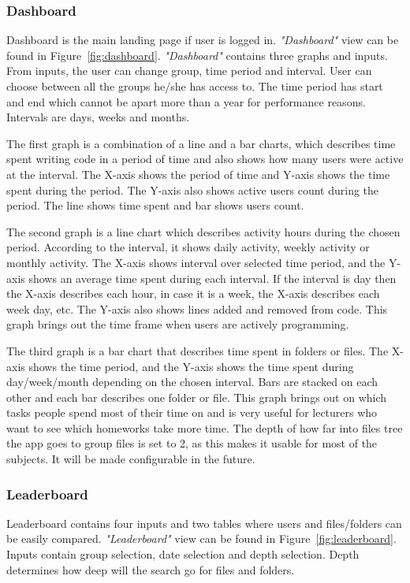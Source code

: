 \subsubsection{Dashboard}\label{subsubsec:dashboard}
Dashboard is the main landing page if user is logged in.
\textit{"Dashboard"} view can be found in Figure~\ref{fig:dashboard}.
\textit{"Dashboard"} contains three graphs and inputs.
From inputs, the user can change group, time period and interval.
User can choose between all the groups he/she has access to.
The time period has start and end which cannot be apart more than a year for performance reasons.
Intervals are days, weeks and months.

The first graph is a combination of a line and a bar charts, which describes time spent writing code in a period of time and also shows how many users were active at the interval.
The X-axis shows the period of time and Y-axis shows the time spent during the period.
The Y-axis also shows active users count during the period.
The line shows time spent and bar shows users count.

The second graph is a line chart which describes activity hours during the chosen period.
According to the interval, it shows daily activity, weekly activity or monthly activity.
The X-axis shows interval over selected time period, and the Y-axis shows an average time spent during each interval.
If the interval is day then the X-axis describes each hour, in case it is a week, the X-axis describes each week day, etc.
The Y-axis also shows lines added and removed from code.
This graph brings out the time frame when users are actively programming.

The third graph is a bar chart that describes time spent in folders or files.
The X-axis shows the time period, and the Y-axis shows the time spent during day/week/month depending on the chosen interval.
Bars are stacked on each other and each bar describes one folder or file.
This graph brings out on which tasks people spend most of their time on and is very useful for lecturers who want to see which homeworks take more time.
The depth of how far into files tree the app goes to group files is set to 2, as this makes
it usable for most of the subjects.
It will be made configurable in the future.

\subsubsection{Leaderboard}\label{subsubsec:leaderboard}
Leaderboard contains four inputs and two tables where users and files/folders can be easily compared.
\textit{"Leaderboard"} view can be found in Figure~\ref{fig:leaderboard}.
Inputs contain group selection, date selection and depth selection.
Depth determines how deep will the search go for files and folders.

